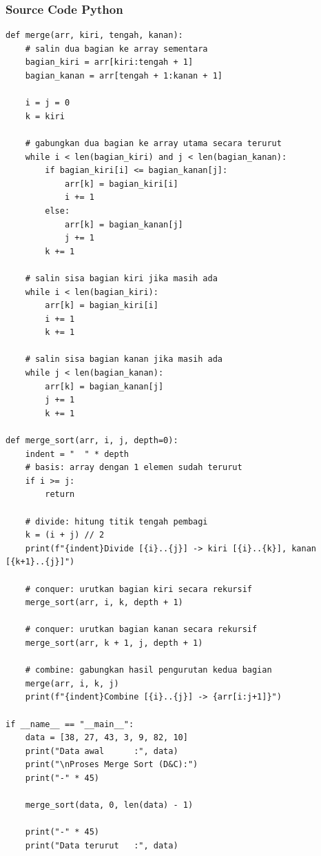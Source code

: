 \subsubsection*{Source Code Python}
\begin{lstlisting}[basicstyle=\ttfamily\scriptsize, frame=single, backgroundcolor=\color{white}, numbers=none, keywordstyle=\color{black}, commentstyle=\color{black}, stringstyle=\color{black}, breaklines=true]
def merge(arr, kiri, tengah, kanan):
    # salin dua bagian ke array sementara
    bagian_kiri = arr[kiri:tengah + 1]
    bagian_kanan = arr[tengah + 1:kanan + 1]
    
    i = j = 0
    k = kiri
    
    # gabungkan dua bagian ke array utama secara terurut
    while i < len(bagian_kiri) and j < len(bagian_kanan):
        if bagian_kiri[i] <= bagian_kanan[j]:
            arr[k] = bagian_kiri[i]
            i += 1
        else:
            arr[k] = bagian_kanan[j]
            j += 1
        k += 1
        
    # salin sisa bagian kiri jika masih ada
    while i < len(bagian_kiri):
        arr[k] = bagian_kiri[i]
        i += 1
        k += 1
        
    # salin sisa bagian kanan jika masih ada
    while j < len(bagian_kanan):
        arr[k] = bagian_kanan[j]
        j += 1
        k += 1

def merge_sort(arr, i, j, depth=0):
    indent = "  " * depth
    # basis: array dengan 1 elemen sudah terurut
    if i >= j:
        return
        
    # divide: hitung titik tengah pembagi
    k = (i + j) // 2
    print(f"{indent}Divide [{i}..{j}] -> kiri [{i}..{k}], kanan [{k+1}..{j}]")
    
    # conquer: urutkan bagian kiri secara rekursif
    merge_sort(arr, i, k, depth + 1)
    
    # conquer: urutkan bagian kanan secara rekursif
    merge_sort(arr, k + 1, j, depth + 1)
    
    # combine: gabungkan hasil pengurutan kedua bagian
    merge(arr, i, k, j)
    print(f"{indent}Combine [{i}..{j}] -> {arr[i:j+1]}")

if __name__ == "__main__":
    data = [38, 27, 43, 3, 9, 82, 10]
    print("Data awal      :", data)
    print("\nProses Merge Sort (D&C):")
    print("-" * 45)
    
    merge_sort(data, 0, len(data) - 1)
    
    print("-" * 45)
    print("Data terurut   :", data)
\end{lstlisting}

